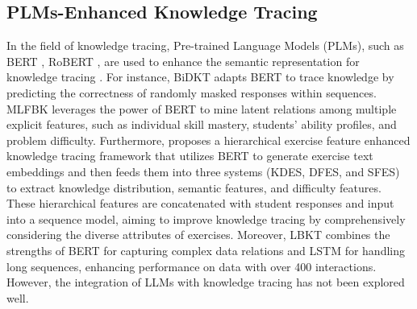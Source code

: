\subsection{PLMs-Enhanced Knowledge Tracing}
In the field of knowledge tracing, Pre-trained Language Models (PLMs), such as BERT \cite{bert}, RoBERT \cite{RoBERT}, are used to enhance the semantic representation for knowledge tracing \cite{BiDKT,MLFBK,tong2020exercise,DCL4KT-A}. 
For instance, BiDKT \cite{BiDKT} adapts BERT to trace knowledge by predicting the correctness of randomly masked responses within sequences.
MLFBK \cite{MLFBK} leverages the power of BERT to mine latent relations among multiple explicit features, such as individual skill mastery, students' ability profiles, and problem difficulty.
Furthermore, \citet{tong2020exercise} proposes a hierarchical exercise feature enhanced knowledge tracing framework that utilizes BERT to generate exercise text embeddings and then feeds them into three systems (KDES, DFES, and SFES) to extract knowledge distribution, semantic features, and difficulty features. These hierarchical features are concatenated with student responses and input into a sequence model, aiming to improve knowledge tracing by comprehensively considering the diverse attributes of exercises.
Moreover, LBKT \cite{lstm_bert} combines the strengths of BERT for capturing complex data relations and LSTM for handling long sequences, enhancing performance on data with over 400 interactions. 
However, the integration of LLMs with knowledge tracing has not been explored well.



